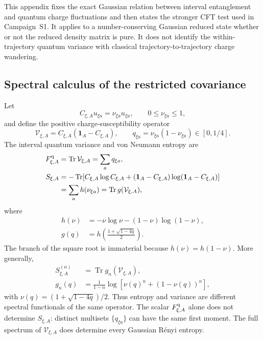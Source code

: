 \documentclass[aps,prx,twocolumn,floatfix,nofootinbib,superscriptaddress,longbibliography]{revtex4-2}
\newcommand{\qTr}{\operatorname{Tr}}
\begin{document}
This appendix fixes the exact Gaussian relation between interval entanglement and quantum
charge fluctuations and then states the stronger CFT test used in Campaign~S1.  It applies
to a number-conserving Gaussian reduced state whether or not the reduced density matrix is
pure.  It does not identify the within-trajectory quantum variance with classical
trajectory-to-trajectory charge wandering.

\subsection{Spectral calculus of the restricted covariance}

Let
\begin{equation}
 C_{\xi,A}u_{\xi a}=\nu_{\xi a}u_{\xi a},
 \qquad 0\leq \nu_{\xi a}\leq1,
\end{equation}
and define the positive charge-susceptibility operator
\begin{equation}
 \mathcal V_{\xi,A}
 =C_{\xi,A}(\mathbf{1}_A-C_{\xi,A}),
 \qquad
 q_{\xi a}=\nu_{\xi a}(1-\nu_{\xi a})\in[0,1/4].
 \label{eq:charge-susceptibility-operator}
\end{equation}
The interval quantum variance and von Neumann entropy are
\begin{align}
 F_{\xi,A}^{\rm q}
 &=\qTr\mathcal V_{\xi,A}
   =\sum_aq_{\xi a},\label{eq:variance-from-V}\\
 S_{\xi,A}
 &=-\qTr\!\left[
 C_{\xi,A}\log C_{\xi,A}
 +(\mathbf{1}_A-C_{\xi,A})\log(\mathbf{1}_A-C_{\xi,A})\right]\nonumber\\
 &=\sum_a h(\nu_{\xi a})
   =\qTr g(\mathcal V_{\xi,A}),\label{eq:entropy-from-V}
\end{align}
where
\begin{equation}
 \begin{aligned}
 h(\nu)&=-\nu\log\nu-(1-\nu)\log(1-\nu),\\
 g(q)&=h\!\left(\frac{1+\sqrt{1-4q}}{2}\right).
 \end{aligned}
 \label{eq:entropy-kernel-q}
\end{equation}
The branch of the square root is immaterial because $h(\nu)=h(1-\nu)$.  More generally,
\begin{equation}
 \begin{aligned}
 S_{\xi,A}^{(n)}&=\qTr g_n(\mathcal V_{\xi,A}),\\
 g_n(q)&=\frac{1}{1-n}
 \log\!\left[\nu(q)^n+(1-\nu(q))^n\right],
 \end{aligned}
 \label{eq:renyi-from-V}
\end{equation}
with $\nu(q)=(1+\sqrt{1-4q})/2$.  Thus entropy and variance are different spectral
functionals of the same operator.  The scalar $F_{\xi,A}^{\rm q}$ alone does not determine
$S_{\xi,A}$: distinct multisets $\{q_{\xi a}\}$ can have the same first moment.  The full
spectrum of $\mathcal V_{\xi,A}$ does determine every Gaussian R\'enyi entropy.
\end{document}
